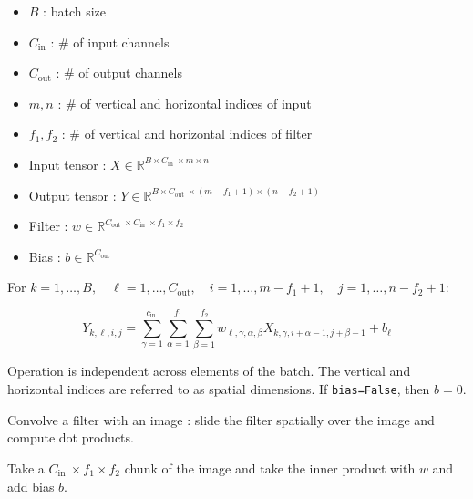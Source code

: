 \documentclass{report}
\begin{document}
\begin{definition}
    \begin{itemize}
        \item $B$ : batch size
        \item $C_{\text{in}}$ : \# of input channels
        \item $C_{\text{out}}$ : \# of output channels
        \item $m, n$ : \# of vertical and horizontal indices of input
        \item $f_1, f_2$ : \# of vertical and horizontal indices of filter
    \end{itemize}

    \par\noindent\textcolor{gray}{\hdashrule{\textwidth}{0.4pt}{1pt 2pt}}

    \begin{itemize}
        \item Input tensor : $X \in \mathbb{R}^{B \times C_{\text {in }} \times m \times n}$
        \item Output tensor : $Y \in \mathbb{R}^{B \times C_{\text {out }} \times\left(m-f_{1}+1\right) \times\left(n-f_{2}+1\right)}$
        \item Filter : $w \in \mathbb{R}^{C_{\text {out }} \times C_{\text {in }} \times f_{1} \times f_{2}}$
        \item Bias : $b \in \mathbb{R}^{C_{\text{out}}}$
    \end{itemize}

    \par\noindent\textcolor{gray}{\hdashrule{\textwidth}{0.4pt}{1pt 2pt}}

    For $k = 1, \dots, B, \quad \ell = 1, \dots, C_{\text{out}}, \quad i = 1, \dots, m-f_1+1, \quad j = 1, \dots, n-f_2+1$:

    $$
    Y_{k, \ell, i, j}=\sum_{\gamma=1}^{c_{\text {in }}} \sum_{\alpha=1}^{f_{1}} \sum_{\beta=1}^{f_{2}} w_{\ell, \gamma, \alpha, \beta} X_{k, \gamma, i+\alpha-1, j+\beta-1}+b_{\ell}
    $$

    Operation is independent across elements of the batch.
    The vertical and horizontal indices are referred to as spatial dimensions.
    If \verb|bias=False|, then $b=0$.

    \par\noindent\textcolor{gray}{\hdashrule{\textwidth}{0.4pt}{1pt 2pt}}

    Convolve a filter with an image : slide the filter spatially over the image and compute dot products.

    Take a $C_{\text {in }} \times f_{1} \times f_{2}$ chunk of the image and take the inner product with $w$ and add bias $b$.
\end{definition}
\end{document}
